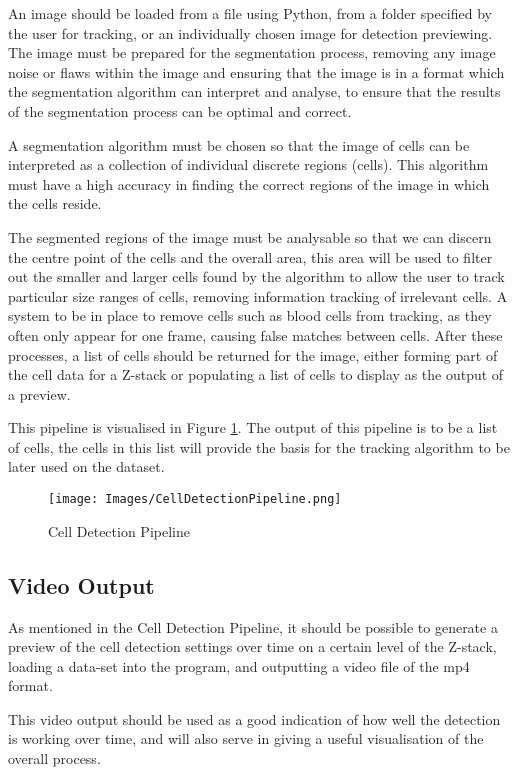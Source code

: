 \documentclass[12pt a4paper]{article}
\begin{document}
An image should be loaded from a file using Python, from a folder specified by the user for tracking, or an individually chosen image for detection previewing. The image must be prepared for the segmentation process, removing any image noise or flaws within the image and ensuring that the image is in a format which the segmentation algorithm can interpret and analyse, to ensure that the results of the segmentation process can be optimal and correct. 

A segmentation algorithm must be chosen so that the image of cells can be interpreted as a collection of individual discrete regions (cells). This algorithm must have a high accuracy in finding the correct regions of the image in which the cells reside.

The segmented regions of the image must be analysable so that we can discern the centre point of the cells and the overall area, this area will be used to filter out the smaller and larger cells found by the algorithm to allow the user to track particular size ranges of cells, removing information tracking of irrelevant cells. A system to be in place to remove cells such as blood cells from tracking, as they often only appear for one frame, causing false matches between cells. After these processes, a list of cells should be returned for the image, either forming part of the cell data for a Z-stack or populating a list of cells to display as the output of a preview.

This pipeline is visualised in  Figure \ref{fig:cellDetPipeline}. The output of this pipeline is to be a list of cells, the cells in this list will provide the basis for the tracking algorithm to be later used on the dataset.
\begin{figure}
    \centering
    \texttt{[image: Images/CellDetectionPipeline.png]}
    \caption{Cell Detection Pipeline}
    \label{fig:cellDetPipeline}
\end{figure}
\subsection{Video Output}
As mentioned in the Cell Detection Pipeline, it should be possible to generate a preview of the cell detection settings over time on a certain level of the Z-stack, loading a data-set into the program, and outputting a video file of the mp4 format. 

This video output should be used as a good indication of how well the detection is working over time, and will also serve in giving a useful visualisation of the overall process.
\end{document}
